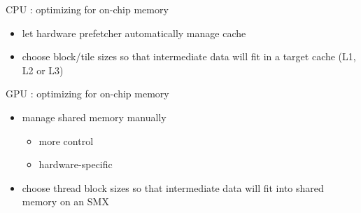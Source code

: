 \begin{frame}[fragile]{}
\begin{columns}[T]
\begin{column}{0.5\textwidth}
        \end{column}
    \end{columns}



\end{frame}

\begin{frame}[fragile]{}
    \begin{info}{CPU : optimizing for on-chip memory}
        \begin{itemize}
            \item let hardware prefetcher automatically manage cache
            \item choose block/tile sizes so that intermediate data will fit in a target cache (L1, L2 or L3)
        \end{itemize}
    \end{info}
    \begin{info}{GPU : optimizing for on-chip memory}
        \begin{itemize}
            \item manage shared memory manually
            \begin{itemize}
                \item more control
                \item hardware-specific
            \end{itemize}
            \item choose thread block sizes so that intermediate data will fit into shared memory on an SMX
        \end{itemize}
    \end{info}

\end{frame}

